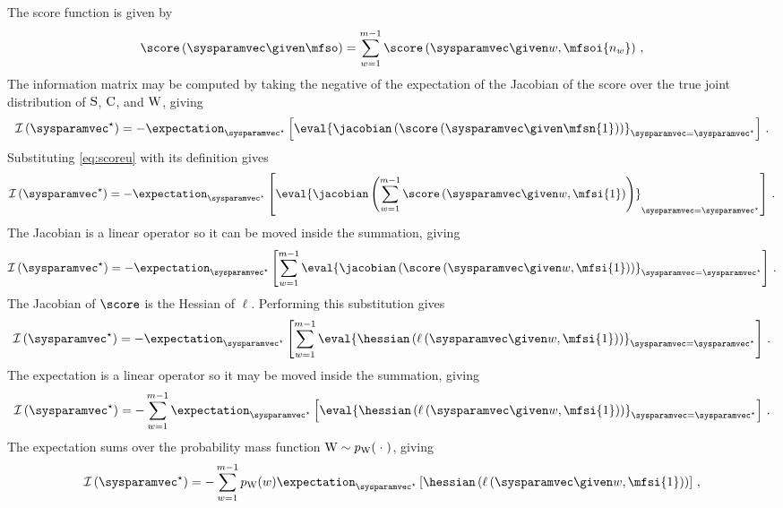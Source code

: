 \documentclass[../main.tex]{subfiles}
\begin{document}
The score function is given by
\begin{equation}
\label{eq:scoreu}
    \score\left(\sysparamvec \given \mfso\right) = \sum_{w=1}^{m-1} \score\left(\sysparamvec \given w, \mfsoi{n_w}\right)\,,
\end{equation}
The information matrix may be computed by taking the negative of the expectation of the Jacobian of the score over the true joint distribution of $\mathrm{S}$, $\mathrm{C}$, and $\mathrm{W}$, giving
\begin{equation}
    \infomatrx\left(\tparam\sysparamvec\right) = -\expectation_{\tparam\sysparamvec}\left[\eval{\jacobian\left(\score\left(\sysparamvec \given \mfsn{1}\right)\right)}_{\sysparamvec=\tparam\sysparamvec}\right]\,.
\end{equation}
Substituting \cref{eq:scoreu} with its definition gives
\begin{equation}
    \infomatrx\left(\tparam\sysparamvec\right) = -\expectation_{\tparam\sysparamvec}\left[\eval{\jacobian\left(\sum_{w=1}^{m-1} \score\left(\sysparamvec \given w, \mfsi{1}\right)\right)}_{\sysparamvec = \tparam\sysparamvec}\right]\,.
\end{equation}
The Jacobian is a linear operator so it can be moved inside the summation, giving
\begin{equation}
    \infomatrx\left(\tparam\sysparamvec\right) = 
    -\expectation_{\tparam\sysparamvec}\left[\sum_{w=1}^{m-1} \eval{\jacobian\left(\score\left(\sysparamvec \given w, \mfsi{1}\right)\right)}_{\sysparamvec=\tparam\sysparamvec}\right]\,.
\end{equation}
The Jacobian of $\score$ is the Hessian of $\ell$. Performing this substitution gives
\begin{equation}
    \infomatrx\left(\tparam\sysparamvec\right) = -\expectation_{\tparam\sysparamvec}\left[\sum_{w=1}^{m-1} \eval{\hessian\left(\ell\left(\sysparamvec \given w, \mfsi{1}\right)\right)}_{\sysparamvec=\tparam\sysparamvec}\right]\,.
\end{equation}
The expectation is a linear operator so it may be moved inside the summation, giving
\begin{equation}
    \infomatrx\left(\tparam\sysparamvec\right) = -\sum_{w=1}^{m-1} \expectation_{\tparam\sysparamvec}\left[\eval{\hessian\left(\ell\left(\sysparamvec \given w, \mfsi{1}\right)\right)}_{\sysparamvec=\tparam\sysparamvec}\right]\,.
\end{equation}
The expectation sums over the probability mass function $\mathrm{W} \sim p_{\mathrm{W}}(\;\cdot\;)$, giving
\begin{equation}
    \infomatrx\left(\tparam\sysparamvec\right)
        = -\sum_{w=1}^{m-1} \pmf_{\RV{W}}(w) \expectation_{\tparam\sysparamvec}\left[\hessian\left(\ell\left(\sysparamvec \given w, \mfsi{1}\right)\right)\right]\,,
\end{equation}
\end{document}
